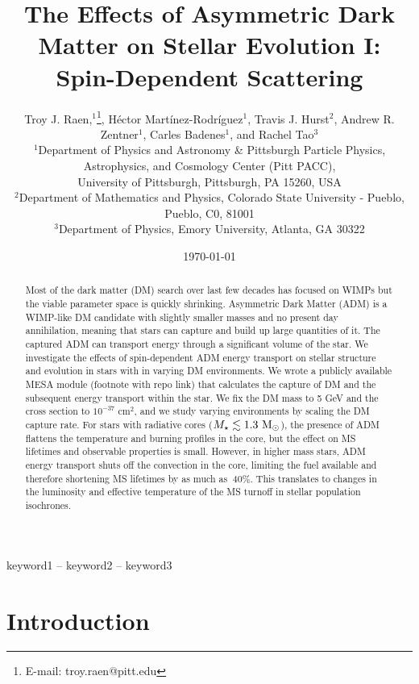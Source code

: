 \documentclass[useAMS,usenatbib]{mnras}
\title[Asymmetric Dark Matter in Stars]{The Effects of Asymmetric Dark Matter on Stellar Evolution I: Spin-Dependent Scattering}
\author[T.J. Raen et al.]{%
Troy J. Raen,$^{1}$\thanks{E-mail: troy.raen@pitt.edu},
Héctor Martínez-Rodríguez$^{1}$, 
Travis J. Hurst$^{2}$,
Andrew R. Zentner$^{1}$,\newauthor
Carles Badenes$^{1}$,
and Rachel Tao$^{3}$
\vspace*{12pt}
\\
$^{1}$Department of Physics and Astronomy \& Pittsburgh Particle Physics, Astrophysics, and Cosmology Center (Pitt PACC),\\ University of Pittsburgh, Pittsburgh, PA 15260, USA\\
$^{2}$Department of Mathematics and Physics, Colorado State University -  Pueblo, Pueblo, C0, 81001 \\%
$^{3}$Department of Physics, Emory University, Atlanta, GA 30322
}
\date{\today}
\begin{document}
\label{firstpage}
\pagerange{\pageref{firstpage}--\pageref{lastpage}}
\maketitle



\begin{abstract}
Most of the dark matter (DM) search over last few decades has focused on WIMPs but the viable parameter space is quickly shrinking. Asymmetric Dark Matter (ADM) is a WIMP-like DM candidate with slightly smaller masses and no present day annihilation, meaning that stars can capture and build up large quantities of it. The captured ADM can transport energy through a significant volume of the star. We investigate the effects of spin-dependent ADM energy transport on stellar structure and evolution in stars with \mrange in varying DM environments. We wrote a publicly available MESA module (footnote with repo link) that calculates the capture of DM and the subsequent energy transport within the star. We fix the DM mass to 5 GeV and the cross section to $10^{-37}$ cm${^2}$, and we study varying environments by scaling the DM capture rate. For stars with radiative cores ($M_{\star} \lesssim 1.3 \ \mathrm{M}_{\odot}$), the presence of ADM flattens the temperature and burning profiles in the core, but the effect on MS lifetimes and observable properties is small. However, in higher mass stars, ADM energy transport shuts off the convection in the core, limiting the fuel available and therefore shortening MS lifetimes by as much as $~40\%$. This translates to changes in the luminosity and effective temperature of the MS turnoff in stellar population isochrones.
\end{abstract}

\begin{keywords}
keyword1 -- keyword2 -- keyword3
\end{keywords}









\section{Introduction}
\label{sec:intro}
\end{document}
